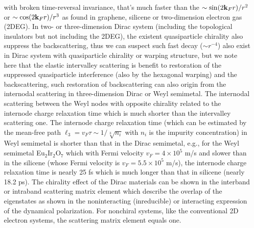 \documentclass[UTF8,a4paper]{article}
\begin{document}
\begin{large}
with broken time-reversal invariance,
that's 
much faster than the $\sim{\rm sin}(2{\bf k}_{F}r)/r^{2}$ or $\sim{\rm cos}(2{\bf k}_{F}r)/r^{3}$ as found in graphene, 
silicene\cite{Wu C H3,XX,Wu C H_3,Chang H R} or 
two-dimension electron gas (2DEG)\cite{Wu C H3,Wunsch B}.
In two- or three-dimension Dirac system (including the topological insulators
but not including the 2DEG),
the existent quasiparticle chirality also suppress the backscattering,
thus we can suspect such fast decay ($\sim r^{-4}$) also exist in Dirac system with quasiparticle chirality or warping structure,
but we note here that 
the elastic intervalley scattering is benefit to restoration of the suppressed quasiparticle interference (also by the hexagonal warping\cite{XX}) 
and the backscattering,
such restoration of backscattering can also origin from the internodal scattering in three-dimension Dirac or Weyl semimetal\cite{Lv M}.
The internodal scattering between the Weyl nodes with opposite chirality
related to the internode charge relaxation time which is much shorter than the intervalley scattering one.
The internode charge relaxation time 
(which can be estimated by the mean-free path $\ell_{3}=v_{F}\tau\sim 1/\sqrt[3]{n_{i}}$
with $n_{i}$ is the impurity concentration) in Weyl semimetal is shorter than that in the Dirac semimetal, 
e.g., for the Weyl semimetal Eu$_{2}$Ir$_{2}$O$_{7}$ which with Fermi velocity $v_{F}=4\times 10^{5}$ m/s
and slower than in the silicene (whose Fermi velocity is $v_{F}=5.5\times 10^{5}$ m/s), 
the internode charge relaxation time is nearly 25 fs 
which is much longer than that in silicene (nearly 18.2 ps).
The chirality effect of the Dirac materials can be shown in the interband or intraband scattering matrix element
which describe the overlap of the eigenstates
as shown in the noninteracting (inreducible) or interacting expression of the dynamical polarization\cite{Wu C H3,XX,Sensarma R,Sarma S D}.
For nonchiral systems, like the conventional 2D electron systems, the scattering matrix element equals one.


\end{large}
\end{document}
